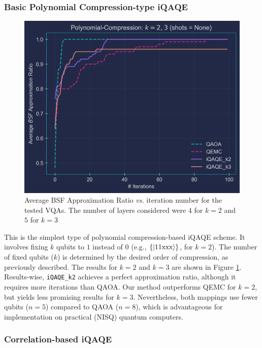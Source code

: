 \subsubsection{Basic Polynomial Compression-type iQAQE}
\label{subsubsection:Basic_Polynomial_iQAQE}
\vspace{-2.5mm}
\begin{figure}[H]
    \centering
    \includegraphics[width=0.95\columnwidth]{Figures/Polynomial_Compression_Base_k2_k3_1.png}
    \caption{Average BSF Approximation Ratio \textit{vs.} iteration number for the tested VQAs. The number of layers considered were $4$ for $k = 2$ and $5$ for $k = 3$}
    \label{fig:Comparison_k2+k3_2}
\end{figure}
\vspace{-3.5mm}
This is the simplest type of polynomial compression-based iQAQE scheme. It involves fixing $k$ qubits to $1$ instead of $0$ (e.g., $\{\ket{11\text{xxx}}\}$, for $k = 2$). The number of fixed qubits ($k$) is determined by the desired order of compression, as previously described. The results for $k = 2$ and $k = 3$ are shown in Figure \ref{fig:Comparison_k2+k3_2}. Results-wise, \texttt{iQAQE\_k2} achieves a perfect approximation ratio, although it requires more iterations than QAOA. Our method outperforms QEMC for $k = 2$, but yields less promising results for $k = 3$. Nevertheless, both mappings use fewer qubits ($n = 5$) compared to QAOA ($n = 8$), which is advantageous for implementation on practical (NISQ) quantum computers.

\subsubsection{Correlation-based iQAQE}
\label{subsubsection:Correlation_iQAQE}

